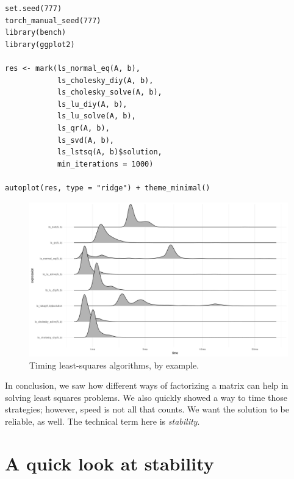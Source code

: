 \documentclass[
  letterpaper,
]{krantz}
\begin{document}
\begin{verbatim}
set.seed(777)
torch_manual_seed(777)
library(bench)
library(ggplot2)

res <- mark(ls_normal_eq(A, b),
            ls_cholesky_diy(A, b),
            ls_cholesky_solve(A, b),
            ls_lu_diy(A, b),
            ls_lu_solve(A, b),
            ls_qr(A, b),
            ls_svd(A, b),
            ls_lstsq(A, b)$solution,
            min_iterations = 1000)

autoplot(res, type = "ridge") + theme_minimal()
\end{verbatim}

\begin{figure}[H]

{\centering \includegraphics{images/least-squares-benchmark.png}

}

\caption{\label{fig-least-squares-benchmark}Timing least-squares
algorithms, by example.}

\end{figure}

In conclusion, we saw how different ways of factorizing a matrix can
help in solving least squares problems. We also quickly showed a way to
time those strategies; however, speed is not all that counts. We want
the solution to be reliable, as well. The technical term here is
\emph{stability}.

\hypertarget{a-quick-look-at-stability}{%
\section{\texorpdfstring{A quick look at
stability}{A quick look at stability}}\label{a-quick-look-at-stability}}
\end{document}
